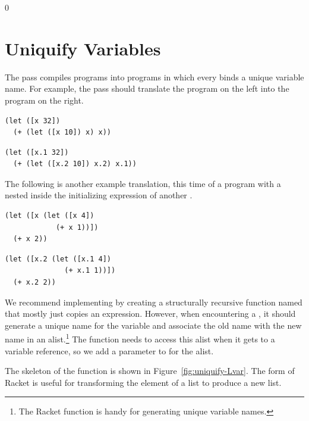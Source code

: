 \documentclass[7x10,nocrop]{TimesAPriori_MIT}%
\def\racketEd{0}
\def\edition{0}
\begin{document}
{\if\edition\racketEd  
\section{Uniquify Variables}
\label{sec:uniquify-Lvar}

The  pass compiles \LangVar{} programs into \LangVar{}
programs in which every  binds a unique variable name. For
example, the  pass should translate the program on the
left into the program on the right. 
\begin{transformation}
\begin{lstlisting}
(let ([x 32])
  (+ (let ([x 10]) x) x))
\end{lstlisting}
\compilesto
\begin{lstlisting}
(let ([x.1 32])
  (+ (let ([x.2 10]) x.2) x.1))
\end{lstlisting}
\end{transformation}
The following is another example translation, this time of a program
with a  nested inside the initializing expression of another
.
\begin{transformation}
\begin{lstlisting}
(let ([x (let ([x 4])
            (+ x 1))])
  (+ x 2))
\end{lstlisting}
\compilesto
\begin{lstlisting}
(let ([x.2 (let ([x.1 4])
              (+ x.1 1))])
  (+ x.2 2))
\end{lstlisting}
\end{transformation}

We recommend implementing  by creating a structurally
recursive function named  that mostly just copies
an expression. However, when encountering a , it should
generate a unique name for the variable and associate the old name
with the new name in an alist.\footnote{The Racket function
   is handy for generating unique variable names.} The
 function needs to access this alist when it gets
to a variable reference, so we add a parameter to 
for the alist.

The skeleton of the  function is shown in
Figure~\ref{fig:uniquify-Lvar}.
The
%
\href{https://docs.racket-lang.org/reference/for.html#%28form._%28%28lib._racket%2Fprivate%2Fbase..rkt%29._for%2Flist%29%29}{\key{for/list}}
%
form of Racket is useful for transforming the element of a list to
produce a new list.

}
\end{document}
